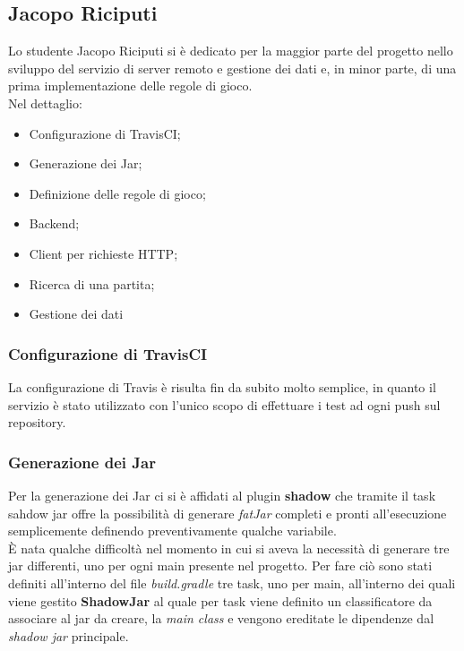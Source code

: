         \subsection{Jacopo Riciputi}\label{subsec:riciputi}
	  Lo studente Jacopo Riciputi si è dedicato per la maggior parte del progetto nello sviluppo del servizio di server remoto e gestione dei dati e, in minor parte, di una prima implementazione delle regole di gioco. 
	  \\
	  Nel dettaglio: 
	    \begin{itemize}
	     \item Configurazione di TravisCI;
	     \item Generazione dei Jar;
	     \item Definizione delle regole di gioco;
	     \item Backend;
	     \item Client per richieste HTTP;
	     \item Ricerca di una partita;
	     \item Gestione dei dati
	    \end{itemize}
	    
	
	\subsubsection{Configurazione di TravisCI}
	  La configurazione di Travis è risulta fin da subito molto semplice, in quanto il servizio è stato utilizzato con l'unico scopo di effettuare i test ad ogni push sul repository.
	 
	\subsubsection{Generazione dei Jar} 
	  Per la generazione dei Jar ci si è affidati al plugin \textbf{shadow} che tramite il task sahdow jar
	  offre la possibilità di generare \textit{fatJar} completi e pronti all'esecuzione semplicemente definendo preventivamente qualche variabile. \\
	  È nata qualche difficoltà nel momento in cui si aveva la necessità di generare tre jar differenti, uno per ogni main presente nel progetto. 
	  Per fare ciò sono stati definiti all'interno del file \textit{build.gradle} tre task, uno per main, all'interno dei quali viene gestito \textbf{ShadowJar} 
	  al quale per task viene definito un classificatore da associare al jar da creare, la \textit{main class} 
	  e vengono ereditate le dipendenze dal \textit{shadow jar} principale.
	  

